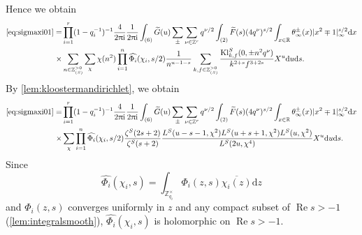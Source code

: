 \documentclass[10pt,oneside,reqno]{amsart}
\makeatletter
\newcommand\rmd{\mathrm{d}}
\newcommand\rmi{\mathrm{i}}
\newcommand\RR{\mathbb{R}}
\newcommand\ZZ{\mathbb{Z}}
\newcommand\dpii{2\uppi\rmi}
\renewcommand\Re{\mathop{\mathrm{Re}}}
\newcommand\Kl{\mathrm{Kl}}
\theoremstyle{THEOREM}
\theoremstyle{DEFINITION}
\theoremstyle{EXERCISE}
\numberwithin{equation}{section}
\renewenvironment{proof}[1][\proofname]{\par
  \vspace{-6pt}
  \pushQED{\qed}
  \normalfont \topsep6\p@\@plus6\p@\relax
  \trivlist
  \item[\hskip\labelsep\rmfamily\bfseries
    #1\@addpunct{:}]\ignorespaces
}{
  \popQED\endtrivlist\@endpefalse
  \vspace{-6pt}
}
\makeatother
\begin{document}
\begin{proof}
Hence we obtain
\begin{align*}
\eqref{eq:sigmaxi01}=&\prod_{i=1}^{r}(1-q_i^{-1})^{-1}\frac{4}{\dpii}\frac{1}{\dpii} \int_{(6)}\widetilde{G}(u)\sum_{\pm}\sum_{\nu\in \ZZ^r}q^{\nu/2}\int_{(2)}\widetilde{F}(s)(4q^\nu)^{s/2}\int_{x\in\RR}\theta_\infty^\pm(x)|x^2\mp 1|_\infty^{s/2}\rmd x\\
  \times& \sum_{n\in \ZZ_{(S)}^{>0}}\sum_{\chi}\chi(n^2)\prod_{i=1}^{n}\widehat{\Phi_i}(\chi_i,s/2)\frac{1} {n^{u-1-s}}\sum_{k,f\in \ZZ_{(S)}^{>0}}\frac{\Kl_{k,f}^S(0,\pm n^2q^\nu)}{k^{2+s}f^{3+2s}} X^u\rmd u\rmd s.
\end{align*}
By \autoref{lem:kloostermandirichlet}, we obtain
\begin{align*}
\eqref{eq:sigmaxi01}=&\prod_{i=1}^{r}(1-q_i^{-1})^{-1}\frac{4}{\dpii}\frac{1}{\dpii} \int_{(6)}\widetilde{G}(u)\sum_{\pm}\sum_{\nu\in \ZZ^r}q^{\nu/2}\int_{(2)}\widetilde{F}(s)(4q^\nu)^{ s/2}\int_{x\in\RR}\theta_\infty^\pm(x)|x^2\mp 1|_\infty^{s/2}\rmd x\\
  \times&\sum_{\chi}\prod_{i=1}^{n}\widehat{\Phi_i}(\chi_i,s/2) \frac{\zeta^S(2s+2)}{\zeta^S(s+2)} \frac{L^S(u-s-1,\chi^2)L^S(u+s+1,\chi^2)L^S(u,\chi^2)}{L^S(2u,\chi^4)}X^u\rmd u\rmd s.
\end{align*}
Since
\[
\widehat{\Phi_i}(\chi_i,s)=\int_{\ZZ_{q_i}^\times}\Phi_i(z,s)\overline{\chi_i(z)}\rmd z
\]
and $\Phi_i(z,s)$ converges uniformly in $z$ and any compact subset of $\Re s>-1$ (\autoref{lem:integralsmooth}), $\widehat{\Phi_i}(\chi_i,s)$ is holomorphic on $\Re s>-1$.


\end{proof}
\end{document}
